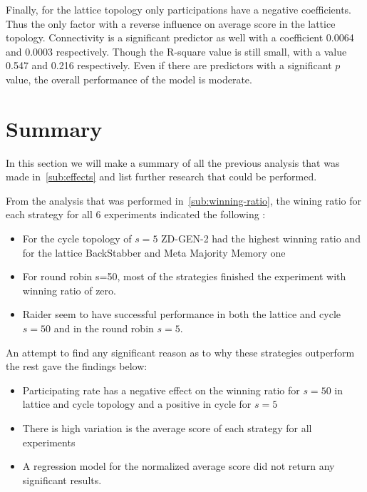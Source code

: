 Finally, for the lattice topology only participations have a negative coefficients.
Thus the only factor with a reverse influence on average score in the lattice topology.
Connectivity is a significant predictor as well with a coefficient 0.0064 and
0.0003 respectively. Though the R-square value is still  small,
with a value 0.547 and 0.216 respectively.
Even if there are predictors with a significant \(p\) value, the overall
performance of the model is moderate.



\section{Summary}

In this section we will make a summary of all the previous analysis that was made
in~\ref{sub:effects} and list further research that could be performed.

From the analysis that was performed in~\ref{sub:winning-ratio}, the wining ratio
for each strategy for all 6 experiments indicated the following :

\begin{itemize}
  \item For the cycle topology of \(s=5\) ZD-GEN-2 had the highest winning ratio
        and for the lattice BackStabber and Meta Majority Memory one
  \item For round robin s=50, most of the strategies finished the experiment
        with winning ratio of zero.
  \item Raider seem to have successful performance in both the lattice and cycle \(s=50\)
        and in the round robin \(s=5\).
\end{itemize}

An attempt to find any significant reason as to why these strategies outperform
the rest gave the findings below:

\begin{itemize}
  \item Participating rate has a negative effect on the winning ratio for \(s=50\)
        in lattice and cycle topology and a positive in cycle for \(s=5\)
  \item There is high variation is the average score of each strategy for all
        experiments
  \item A regression model for the normalized average score did not return any
        significant results.
\end{itemize}

